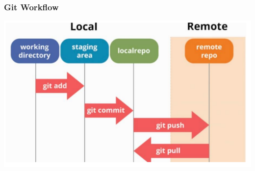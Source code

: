 \subsubsection*{\hspace{10pt}Git Workflow}
\begin{center}
	\includegraphics{"Temas/Tema 1/screenshot006"}
\end{center}
